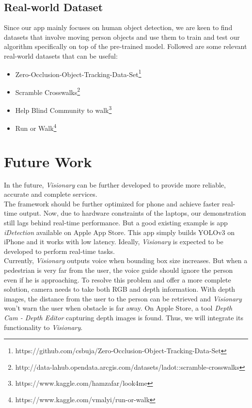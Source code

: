 \documentclass[letterpaper]{article} %
\begin{document}
\subsection{Real-world Dataset}
Since our app mainly focuses on human object detection, we are keen to find datasets that involve moving person objects and use them to train and test our algorithm specifically on top of the pre-trained model. Followed are some relevant real-world datasets that can be useful:
\begin{itemize}
    \item Zero-Occlusion-Object-Tracking-Data-Set\footnote{https://github.com/csbuja/Zero-Occlusion-Object-Tracking-Data-Set}
    \item Scramble Crosswalks\footnote{http://data-lahub.opendata.arcgis.com/datasets/ladot::scramble-crosswalks}
    \item Help Blind Community to walk\footnote{https://www.kaggle.com/hamzafar/look4me}
    \item Run or Walk\footnote{https://www.kaggle.com/vmalyi/run-or-walk}
\end{itemize}

\section{Future Work}
In the future, \textit{Visionary} can be further developed to provide more reliable, accurate and complete services.\\

\noindent The framework should be further optimized for phone and achieve faster real-time output. Now, due to hardware constraints of the laptops, our demonstration still lags behind real-time performance. But a good existing example is app \textit{iDetection} available on Apple App Store. This app simply builds YOLOv3 on iPhone and it works with low latency. Ideally, \textit{Visionary} is expected to be developed to perform real-time tasks.\\ 

\noindent Currently, \textit{Visionary} outputs voice when bounding box size increases. But when a pedestrian is very far from the user, the voice guide should ignore the person even if he is approaching. To resolve this problem and offer a more complete solution, camera needs to take both RGB and depth information. With depth images, the distance from the user to the person can be retrieved and \textit{Visionary} won't warn the user when obstacle is far away. On Apple Store, a tool \textit{Depth Cam - Depth Editor} capturing depth images is found. Thus, we will integrate its functionality to \textit{Visionary}.
\end{document}

